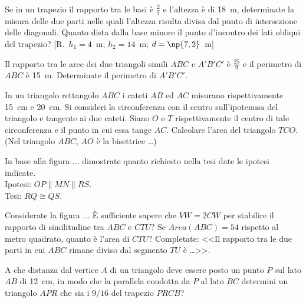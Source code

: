 \begin{multicols}{2}
\begin{esercizio}
\label{ese:6.87}
Se in un trapezio il rapporto tra le basi è $\frac{2}{7}$ e l'altezza è di 18~m, determinate la misura delle due parti nelle quali l'altezza risulta divisa dal punto di intersezione delle diagonali. Quanto dista dalla base minore il punto d'incontro dei lati obliqui del trapezio?  [R.~$h_1=4$~m; $h_2=14$~m; $d=\np{7,2}$~m]
\end{esercizio}

\begin{esercizio}
\label{ese:6.88}
Il rapporto tra le aree dei due triangoli simili $ABC$ e $A'B'C'$ è $\frac{25}{9}$ e il perimetro di $ABC$ è 15~m. Determinate il perimetro di $A'B'C'$.
\end{esercizio}

\begin{esercizio}
\label{ese:6.89}
In un triangolo rettangolo $ABC$ i cateti $AB$ ed $AC$ misurano rispettivamente 15~cm e 20~cm. Si consideri la circonferenza con il centro sull'ipotenusa del triangolo e tangente ai due cateti. Siano $O$ e $T$ rispettivamente il centro di tale circonferenza e il punto in cui essa tange $AC$. Calcolare l'area del triangolo $TCO$. (Nel triangolo $ABC$, $AO$ è la bisettrice \ldots)
\end{esercizio}

\begin{esercizio}
\label{ese:6.90}
In base alla figura ... dimostrate quanto richiesto nella tesi date le ipotesi indicate.\\
Ipotesi: $OP\parallel MN\parallel RS$.\\
Tesi: $RQ\cong QS$.
\end{esercizio}

\begin{esercizio}
\label{ese:6.91}
Considerate la figura ... \`E sufficiente sapere che $VW=2CW$ per stabilire il rapporto di similitudine tra $ABC$ e $CTU$? Se $Area(ABC) = 54$ rispetto al metro quadrato, quanto è l'area di $CTU$? Completate: <<Il rapporto tra le due parti in cui $ABC$ rimane diviso dal segmento $TU$ è \ldots{}>>.
\end{esercizio}

\begin{esercizio}
\label{ese:6.92}
A che distanza dal vertice $A$ di un triangolo deve essere posto un punto $P$ sul lato $AB$ di 12~cm, in modo che la parallela condotta da $P$ al lato $BC$ determini un triangolo $APR$ che sia i $9/16$ del trapezio $PRCB$?
\end{esercizio}


\end{multicols}
